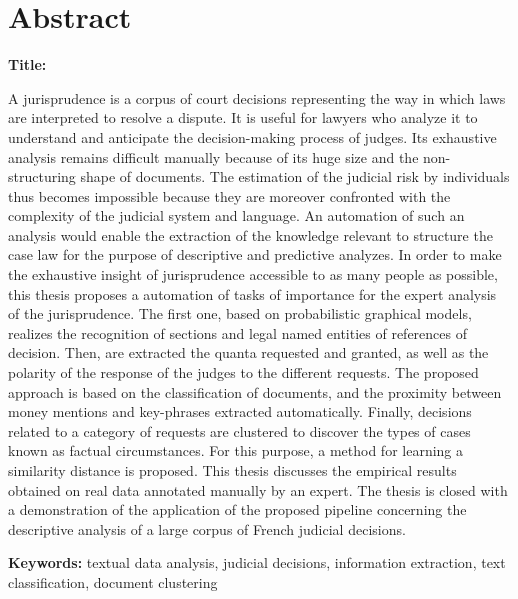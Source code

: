 \chapter*{Abstract}
\textbf{Title:} \textsc{\titleen}

A jurisprudence is a corpus of court decisions representing the way in which laws are interpreted to resolve a dispute. It is useful for lawyers who analyze it to understand and anticipate the decision-making process of judges. Its exhaustive analysis remains difficult manually because of its huge size and the non-structuring shape of documents. The estimation of the judicial risk by individuals thus becomes impossible because they are moreover confronted with the complexity of  the judicial system and language. An automation of such an analysis would enable the extraction of the knowledge relevant to structure the case law for the purpose of descriptive and predictive analyzes.
In order to make the exhaustive insight of jurisprudence accessible to as many people as possible, this thesis proposes a automation of tasks of importance for the expert analysis of the jurisprudence. The first one, based on probabilistic graphical models, realizes the recognition of sections and legal named entities of references of decision. Then, are extracted the quanta requested and granted, as well as the polarity of the response of the judges to the different requests. The proposed approach is based on the classification of documents, and the proximity between money mentions and key-phrases extracted automatically. Finally, decisions related to a category of requests are clustered to discover the types of cases known as factual circumstances. For this purpose, a method for learning a similarity distance is proposed.
This thesis discusses the empirical results obtained on real data annotated manually by an expert. The thesis is closed with a demonstration of the application of the proposed pipeline concerning the descriptive analysis of a large corpus of French judicial decisions.

\textbf{Keywords:} textual data analysis, judicial decisions, information extraction, text classification, document clustering



